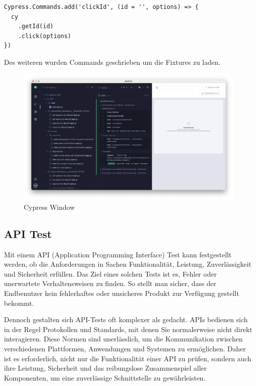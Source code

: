 \begin{lstlisting}
Cypress.Commands.add('clickId', (id = '', options) => {
  cy
    .getId(id)
    .click(options)
})
\end{lstlisting}

Des weiteren wurden Commands geschrieben um die Fixtures zu laden.

\begin{figure}[h!]
    \centering
    \includegraphics[width=1\linewidth]{pics/cypress-overview.png}
    \caption{Cypress Window}
    \label{fig:enter-label}
\end{figure}

\cite{Cypress}
\cite{Testautomatisierung_mit_Cypress}
\subsection{API Test}
Mit einem API (Application Programming Interface) Test kann festgestellt werden, ob die Anforderungen in Sachen Funktionalität, Leistung, Zuverlässigkeit und Sicherheit erfüllen. Das Ziel eines solchen Tests ist es, Fehler oder unerwartete Verhaltensweisen zu finden. So stellt man sicher, dass der Endbenutzer kein fehlerhaftes oder unsicheres Produkt zur Verfügung gestellt bekommt. 

Dennoch gestalten sich API-Tests oft komplexer als gedacht. APIs bedienen sich in der Regel Protokollen und Standards, mit denen Sie normalerweise nicht direkt interagieren. Diese Normen sind unerlässlich, um die Kommunikation zwischen verschiedenen Plattformen, Anwendungen und Systemen zu ermöglichen. Daher ist es erforderlich, nicht nur die Funktionalität einer API zu prüfen, sondern auch ihre Leistung, Sicherheit und das reibungslose Zusammenspiel aller Komponenten, um eine zuverlässige Schnittstelle zu gewährleisten.
\newpage
